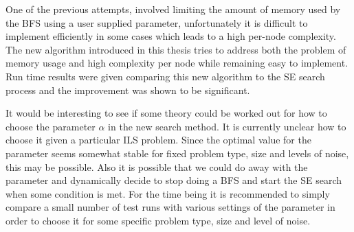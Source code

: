 \documentclass[12pt,Bold,letterpaper]{mcgilletdclass}
\begin{document}
One of the previous attempts, \cite{StuBF07} involved limiting the amount of memory used by the BFS using a user supplied parameter, unfortunately it is difficult to implement efficiently in some cases which leads to a high per-node complexity. The new algorithm introduced in this thesis tries to address both the problem of memory usage and high complexity per node while remaining easy to implement. Run time results were given comparing this new algorithm to the SE search process and the improvement was shown to be significant. 

It would be interesting to see if some theory could be worked out for how to choose the parameter $\alpha$ in the new search method. It is currently unclear how to choose it given a particular ILS problem. Since the optimal value for the parameter seems somewhat stable for fixed problem type, size and levels of noise, this may be possible. Also it is possible that we could do away with the parameter and dynamically decide to stop doing a BFS and start the SE search when some condition is met. For the time being it is recommended to simply compare a small number of test runs with various settings of the parameter in order to choose it for some specific problem type, size and level of noise.








\end{document}
